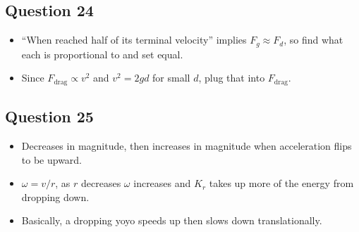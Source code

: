 \documentclass[11pt]{article}
\begin{document}
\subsection*{Question 24}
\begin{itemize}[leftmargin=*]
\item ``When reached half of its terminal velocity'' implies $F_g \approx F_d$, so find what each is proportional to and set equal.
\item Since $F_{\text{drag}} \propto v^2$ and $v^2=2gd$ for small $d$, plug that into $F_{\text{drag}}$.
\end{itemize}

\subsection*{Question 25}
\begin{itemize}[leftmargin=*]
\item Decreases in magnitude, then increases in magnitude when acceleration flips to be upward.
\item $\omega=v/r$, as $r$ decreases $\omega$ increases and $K_r$ takes up more of the energy from dropping down.
\item Basically, a dropping yoyo speeds up then slows down translationally.
\end{itemize}
\end{document}
